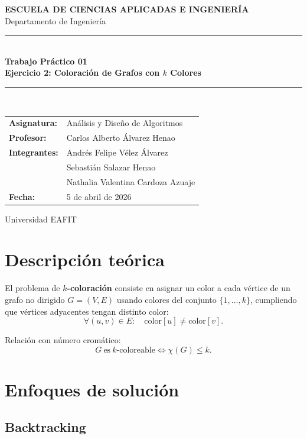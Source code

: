 \documentclass[12pt,a4paper]{article}
\begin{document}
\begin{titlepage}
  \centering
  \vspace*{1cm}
  {\Large \textbf{ESCUELA DE CIENCIAS APLICADAS E INGENIERÍA}}\\[0.3cm]
  {\large Departamento de Ingeniería}\\[1.8cm]

  \rule{\linewidth}{1.2pt}\\[0.3cm]
  {\Huge \textbf{Trabajo Práctico 01}}\\[0.2cm]
  {\LARGE \textbf{Ejercicio 2: Coloración de Grafos con \(k\) Colores}}\\[0.3cm]
  \rule{\linewidth}{1.2pt}\\[1.6cm]

  \begin{tabular}{ll}
    \textbf{Asignatura:} & Análisis y Diseño de Algoritmos \\
    \textbf{Profesor:} & Carlos Alberto Álvarez Henao \\
    \textbf{Integrantes:} & Andrés Felipe Vélez Álvarez \\
                           & Sebastián Salazar Henao \\
                           & Nathalia Valentina Cardoza Azuaje \\
    \textbf{Fecha:} & 5 de abril de 2026
  \end{tabular}

  \vfill
  {\large Universidad EAFIT}
\end{titlepage}

\section{Descripción teórica}

El problema de \textbf{\(k\)-coloración} consiste en asignar un color a cada
vértice de un grafo no dirigido \(G=(V,E)\) usando colores del conjunto
\(\{1,\dots,k\}\), cumpliendo que vértices adyacentes tengan distinto color:
\[
\forall (u,v)\in E:\quad \text{color}[u] \neq \text{color}[v].
\]

Relación con número cromático:
\[
G\ \text{es}\ k\text{-coloreable} \iff \chi(G) \le k.
\]

\section{Enfoques de solución}

\subsection{Backtracking}
\end{document}
